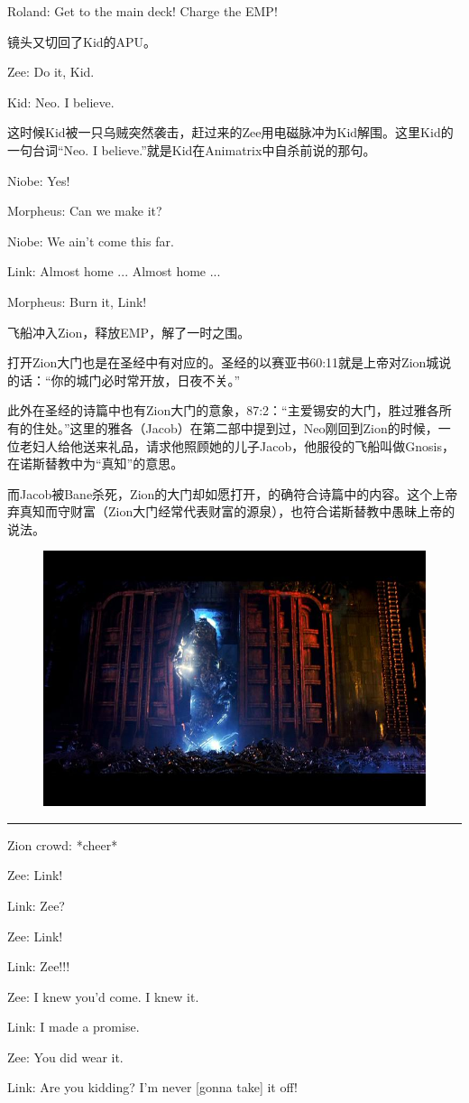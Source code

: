\documentclass[UTF8]{ctexart}
\newcommand{\myparsep}{\noindent \rule[0.5ex]{\linewidth}{1pt}}
\newenvironment{myquote}{\color{green} \setlength{\leftskip}{6em} \setlength{\rightskip}{4em} \setlength{\parindent}{-2em}}{\par}
\begin{document}
\begin{myquote}
Roland: Get to the main deck! Charge the EMP!
\end{myquote}

镜头又切回了Kid的APU。

\begin{myquote}
Zee: Do it, Kid.

Kid: Neo. I believe.
\end{myquote}

这时候Kid被一只乌贼突然袭击，赶过来的Zee用电磁脉冲为Kid解围。这里Kid的一句台词“Neo. I believe.”就是Kid在Animatrix中自杀前说的那句。

\begin{myquote}
Niobe: Yes!

Morpheus: Can we make it?

Niobe: We ain't come this far.

Link: Almost home ... Almost home ...

Morpheus: Burn it, Link!
\end{myquote}

飞船冲入Zion，释放EMP，解了一时之围。

打开Zion大门也是在圣经中有对应的。圣经的以赛亚书60:11就是上帝对Zion城说的话：“你的城门必时常开放，日夜不关。”

此外在圣经的诗篇中也有Zion大门的意象，87:2：“主爱锡安的大门，胜过雅各所有的住处。”这里的雅各（Jacob）在第二部中提到过，Neo刚回到Zion的时候，一位老妇人给他送来礼品，请求他照顾她的儿子Jacob，他服役的飞船叫做Gnosis，在诺斯替教中为“真知”的意思。

而Jacob被Bane杀死，Zion的大门却如愿打开，的确符合诗篇中的内容。这个上帝弃真知而守财富（Zion大门经常代表财富的源泉），也符合诺斯替教中愚昧上帝的说法。

\begin{figure}[htb]
\centering
\includegraphics[width=0.5\linewidth]{fig/a80f54fb5d3ef8166c22eb4d.jpg}
\end{figure}

\myparsep

\begin{myquote}
Zion crowd: *cheer*

Zee: Link!

Link: Zee?

Zee: Link!

Link: Zee!!!

Zee: I knew you'd come. I knew it.

Link: I made a promise.

Zee: You did wear it.

Link: Are you kidding? I'm never [gonna take] it off!
\end{myquote}
\end{document}
